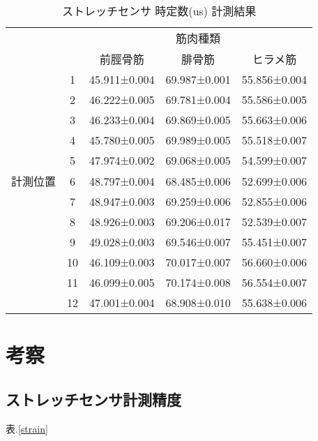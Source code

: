 \begin{table}[h]
    \caption{ストレッチセンサ 時定数(us) 計測結果}
        \begin{center}
            \begin{tabular}{|c|c|ccc|}\hline
            \multicolumn{2}{|c|}{} & \multicolumn{3}{c|}{筋肉種類}\\
            \cline{3-5}
            \multicolumn{2}{|c|}{} & 前脛骨筋 & 腓骨筋 & ヒラメ筋 \\ \hline
            & 1 & 45.911±0.004 & 69.987±0.001 & 55.856±0.004 \\ \cline{2-5}
            & 2 & 46.222±0.005 & 69.781±0.004 & 55.586±0.005 \\ \cline{2-5}
            & 3 & 46.233±0.004 & 69.869±0.005 & 55.663±0.006 \\ \cline{2-5}
            & 4 & 45.780±0.005 & 69.989±0.005 & 55.518±0.007 \\ \cline{2-5}
            & 5 & 47.974±0.002 & 69.068±0.005 & 54.599±0.007 \\ \cline{2-5}
            計測位置 & 6 & 48.797±0.004 & 68.485±0.006 & 52.699±0.006 \\ \cline{2-5}
            & 7 & 48.947±0.003 & 69.259±0.006 & 52.855±0.006 \\ \cline{2-5}
            & 8 & 48.926±0.003 & 69.206±0.017 & 52.539±0.007 \\ \cline{2-5}
            & 9 & 49.028±0.003 & 69.546±0.007 & 55.451±0.007 \\ \cline{2-5}
            & 10 & 46.109±0.003 & 70.017±0.007 & 56.660±0.006 \\ \cline{2-5}
            & 11 & 46.099±0.005 & 70.174±0.008 & 56.554±0.007 \\ \cline{2-5}
            & 12 & 47.001±0.004 & 68.908±0.010 & 55.638±0.006 \\ \hline
        \end{tabular}
    \end{center}
\end{table}

\section{考察}
\subsection{ストレッチセンサ計測精度}
表.\ref{strain}